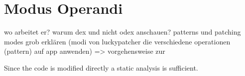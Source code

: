 \section{Modus Operandi}\label{section:luckypatcher-operation}
wo arbeitet er?\newline
warum dex und nicht odex anschauen?\newline
patterns und patching modes grob erklären (modi von luckypatcher die verschiedene operationen (pattern) auf app anwenden) => vorgehensweise zur

Since the code is modified directly a static analysis is sufficient.
